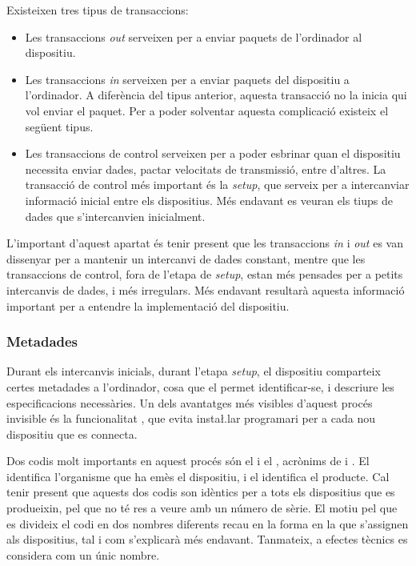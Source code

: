 Existeixen tres tipus de transaccions:
\begin{itemize}
    \item Les transaccions \emph{out} serveixen per a enviar paquets de
    l'ordinador al dispositiu.
    \item Les transaccions \emph{in} serveixen per a enviar paquets del
    dispositiu a l'ordinador. A diferència del tipus anterior, aquesta
    transacció no la inicia qui vol enviar el paquet. Per a poder
    solventar aquesta complicació existeix el següent tipus.
    \item Les transaccions de control serveixen per a poder esbrinar quan el
    dispositiu necessita enviar dades, pactar velocitats de transmissió, entre
    d'altres. La transacció de control més important és la \emph{setup},
    que serveix per a intercanviar informació inicial entre els dispositius. Més
    endavant es veuran els tiups de dades que s'intercanvien inicialment.
\end{itemize}

L'important d'aquest apartat és tenir present que les transaccions \emph{in} i
\emph{out} es van dissenyar per a mantenir un intercanvi de dades constant,
mentre que les transaccions de control, fora de l'etapa de \emph{setup}, estan
més pensades per a petits intercanvis de dades, i més irregulars. Més endavant
resultarà aquesta informació important per a entendre la implementació del
dispositiu.

\subsubsection*{Metadades}
\label{subsubsec:metadades}

Durant els intercanvis inicials, durant l'etapa \emph{setup}, el dispositiu
comparteix certes metadades a l'ordinador, cosa que el permet identificar-se,
i descriure les especificacions necessàries. Un dels avantatges més visibles
d'aquest procés invisible és la funcionalitat , que evita
insta\l.lar programari per a cada nou dispositiu que es connecta.

Dos codis molt importants en aquest procés són el  i el ,
acrònims de  i . El  identifica
l'organisme que ha emès el dispositiu, i el  identifica el producte.
Cal tenir present que aquests dos codis son idèntics per a tots els dispositius
que es produeixin, pel que no té res a veure amb un número de sèrie. El motiu
pel que es divideix el codi en dos nombres diferents recau en la forma en la
que s'assignen als dispositius, tal i com s'explicarà més endavant. Tanmateix,
a efectes tècnics es considera com un únic nombre.

